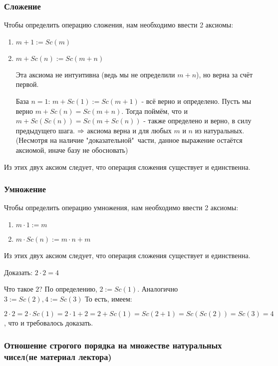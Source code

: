 \subsubsection{Сложение}

Чтобы определить операцию сложения, нам необходимо ввести 2 аксиомы:
\begin{enumerate}
    \item $m + 1 := Sc(m)$
    \item $m + Sc(n) := Sc(m + n)$
    \begin{note}
        Эта аксиома не интуитивна (ведь мы не определили $m + n$), но верна за счёт первой.
        
        База $n = 1$: $m + Sc(1) := Sc(m + 1)$ - всё верно и определено.
        Пусть мы верно $m + Sc(n) = Sc(m + n)$. Тогда поймём, что и
        $m + Sc(Sc(n)) = Sc(m + Sc(n))$ - также определено и верно, в силу предыдущего шага.
        $\Rightarrow$ аксиома верна и для любых $m$ и $n$ из натуральных. (Несмотря на наличие "доказательной"\ части, данное выражение остаётся аксиомой, иначе базу не обосновать)
    \end{note}
\end{enumerate}

Из этих двух аксиом следует, что операция сложения существует и единственна.

\subsubsection{Умножение}

Чтобы определить операцию умножения, нам необходимо ввести 2 аксиомы:
\begin{enumerate}
    \item $m \cdot 1 := m$
    \item $m \cdot Sc(n) := m \cdot n + m$
\end{enumerate}

Из этих двух аксиом следует, что операция сложения существует и единственна.

\begin{example}
    Доказать: $2 \cdot 2 = 4$
    
    Что такое $2$? По определению, $2 := Sc(1)$. Аналогично $3 := Sc(2), 4 := Sc(3)$
    То есть, имеем:
    
    $2 \cdot 2 = 2 \cdot Sc(1) = 2 \cdot 1 + 2 = 2 + Sc(1) = Sc(2 + 1) = Sc(Sc(2)) = Sc(3) = 4$, что и требовалось доказать.
\end{example}

\subsubsection*{Отношение строгого порядка на множестве натуральных чисел(не материал лектора)}

